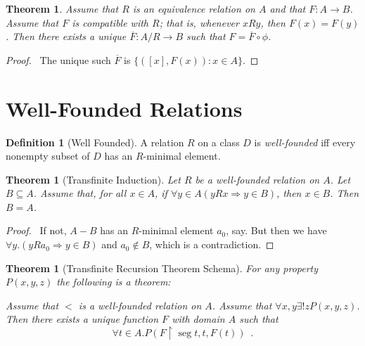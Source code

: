 \documentclass{article}
\let\qed\relax
\newtheorem{theorem}[axiom]{Theorem}
\theoremstyle{definition}
\newtheorem{definition}[axiom]{Definition}
\newcommand{\seg}{\ensuremath{\operatorname{seg}}}
\begin{document}
    \begin{theorem}
        Assume that $R$ is an equivalence relation on $A$ and that $F : A \rightarrow B$.
        Assume that $F$ is \emph{compatible} with $R$; that is, whenever $xRy$, then $F(x) = F(y)$.
        Then there exists a unique $\overline{F} : A / R \rightarrow B$ such that $F = \overline{F} \circ \phi$.
    \end{theorem}

    \begin{proof}
        \pf\ The unique such $\overline{F}$ is $\{ ([x],F(x)) : x \in A \}$. \qed
    \end{proof}

    \section{Well-Founded Relations}

    \begin{definition}[Well Founded]
        A relation $R$ on a class $D$ is \emph{well-founded} iff every nonempty subset of $D$ has an
        $R$-minimal element.
    \end{definition}

    \begin{theorem}[Transfinite Induction]
        Let $R$ be a well-founded relation on $A$. Let $B \subseteq A$. Assume that, for all $x \in A$,
        if $\forall y \in A (yRx \Rightarrow y \in B)$, then $x \in B$. Then $B = A$.
    \end{theorem}

    \begin{proof}
        \pf\ If not, $A - B$ has an $R$-minimal element $a_0$, say. But then we have $\forall y. (y R a_0
        \Rightarrow y \in B)$ and $a_0 \notin B$, which is a contradiction. \qed
    \end{proof}

    \begin{theorem}[Transfinite Recursion Theorem Schema]
        For any property $P(x,y,z)$ the following is a theorem:

        Assume that $<$ is a well-founded relation on $A$. Assume that $\forall x,y \exists ! z P(x,y,z)$.
        Then there exists a unique function $F$ with domain $A$ such that
        \[ \forall t \in A. P(F \restriction \seg t, t, F(t)) \enspace . \]
    \end{theorem}
\end{document}
